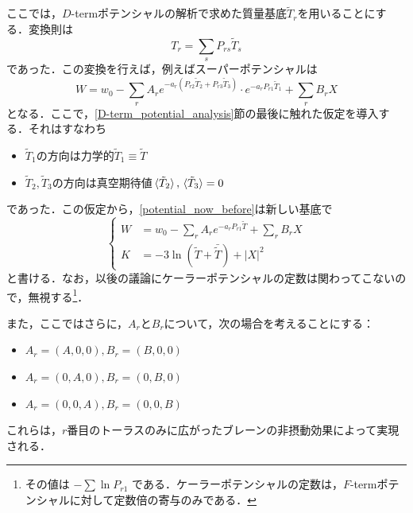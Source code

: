 \documentclass[a4paper,uplatex,dvipdfmx]{jsarticle}
\theoremstyle{definition}
\begin{document}
ここでは，$D$-termポテンシャルの解析で求めた質量基底$\tilde{T}_{r}$を用いることにする．変換則は
\begin{equation}
   T_{r}
   =
   \sum_{s}P_{rs}\tilde{T}_{s}
   \nonumber
\end{equation}
であった．この変換を行えば，例えばスーパーポテンシャルは
\begin{equation}
   W
   =
   w_{0}
   -
   \sum_{r}
   A_{r}e^{-a_{r}(P_{r2}\tilde{T}_{2}+P_{r3}\tilde{T}_{3})}
   \cdot
   e^{-a_{r}P_{r1}\tilde{T}_{1}}
   +
   \sum_{r}
   B_{r}
   X
   \nonumber
\end{equation}
となる．ここで，\ref{D-term_potential_analysis}節の最後に触れた仮定を導入する．それはすなわち
\begin{itemize}
   \item 
   $\tilde{T}_1$の方向は力学的$\tilde{T}_{1}\equiv\tilde{T}$
   \item 
   $\tilde{T}_{2},\tilde{T}_{3}$の方向は真空期待値$\ev*{\tilde{T}_{2}},\ev*{\tilde{T}_{3}}=0$
\end{itemize}   
であった．この仮定から，\eqref{potential_now_before}は新しい基底で
\begin{equation}
   \left\{
      \begin{alignedat}{1}
         W
         &=w_{0}
         -
         \sum_{r}
         A_{r}
         e^{-a_{r}P_{r1}\tilde{T}}
         +
         \sum_{r}
         B_{r}
         X
         \\
         K
         &=
         -
         3\ln(\tilde{T}+\bar{\tilde{T}})
         +
         |X|^2
      \end{alignedat}
   \right.
   \label{potential_now_after}
\end{equation}
と書ける．なお，以後の議論にケーラーポテンシャルの定数は関わってこないので，無視する\footnote{
   その値は
   $
      -\sum\ln P_{r1}
   $
   である．ケーラーポテンシャルの定数は，$F$-termポテンシャルに対して定数倍の寄与のみである．
}．

また，ここではさらに，$A_{r}$と$B_{r}$について，次の場合を考えることにする：
\begin{itemize}
   \item 
   $A_{r}=(A,0,0),B_{r}=(B,0,0)$
   \item 
   $A_{r}=(0,A,0),B_{r}=(0,B,0)$
   \item 
   $A_{r}=(0,0,A),B_{r}=(0,0,B)$
\end{itemize}
これらは，$r$番目のトーラスのみに広がったブレーンの非摂動効果によって実現される\cite{Dine_SupersymmetryString_2023}．
\end{document}
